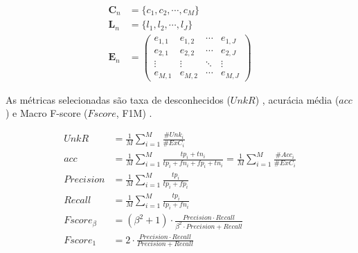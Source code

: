 \begin{align}
  \mathbf{C}_n &= \{ c_1, c_2, \cdots, c_M \}  \label{eq:classes} \\
  \mathbf{L}_n &= \{ l_1, l_2, \cdots, l_J \}  \label{eq:labels} \\
  \mathbf{E}_n &= \begin{pmatrix}
    e_{1,1} & e_{1,2} & \cdots & e_{1,J} \\
    e_{2,1} & e_{2,2} & \cdots & e_{2,J} \\
    \vdots  & \vdots  & \ddots & \vdots  \\
    e_{M,1} & e_{M,2} & \cdots & e_{M,J} 
  \end{pmatrix}  \label{eq:matrix}
\end{align}

As métricas selecionadas são taxa de desconhecidos ($UnkR$) \cite{Faria2013},
acurácia média ($acc$) e Macro F-score ($Fscore$, F1M)
\cite{Sokolova2009,DaSilva2018thesis}.



\begin{align}
  \mathit{UnkR}       &= \frac{1}{M} \sum_{i=1}^{M} \frac{\#Unk_i}{\#ExC_i}\\
  \mathit{acc}        &= \frac{1}{M} \sum_{i=1}^{M} \frac{tp_i + tn_i}{tp_i+fn_i+fp_i+tn_i}
  = \frac{1}{M} \sum_{i=1}^{M} \frac{\#Acc_i}{\#ExC_i}\\
  \mathit{Precision}  &= \frac{1}{M} \sum_{i=1}^{M} \frac{tp_i}{tp_i+fp_i} \\
  \mathit{Recall}     &= \frac{1}{M} \sum_{i=1}^{M} \frac{tp_i}{tp_i+fn_i} \\
  \mathit{Fscore}_\beta &= (\beta^2 +1) \cdot
  \frac{
  \mathit{Precision} \cdot \mathit{Recall}
  }{
    \beta^2 \cdot \mathit{Precision} +\mathit{Recall}
  }\\
  \mathit{Fscore}_1   &= 2 \cdot \frac{
    \mathit{Precision} \cdot \mathit{Recall}
    }{
      \mathit{Precision} +\mathit{Recall}
    } 
\end{align}



